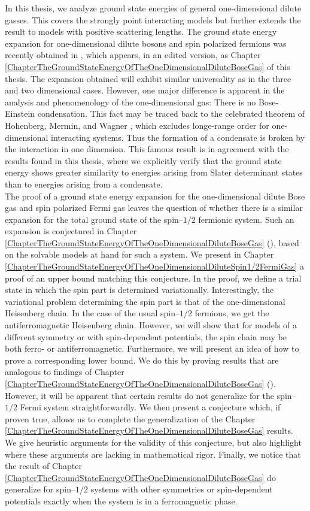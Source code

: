 In this thesis, we analyze ground state energies of general one-dimensional dilute gasses. This covers the strongly point interacting models but further extends the result to models with positive scattering lengths. The ground state energy expansion for one-dimensional dilute bosons and spin polarized fermions was recently obtained in \cite{agerskov2022ground}, which appears, in an edited version, as Chapter \ref{ChapterTheGroundStateEnergyOfTheOneDimensionalDiluteBoseGas} of this thesis. The expansion obtained will exhibit similar universality as in the three and two dimensional cases. However, one major difference is apparent in the analysis and phenomenology of the one-dimensional gas: There is no Bose-Einstein condensation. This fact may be traced back to the celebrated theorem of Hohenberg, Mermin, and Wagner \cite{hohenberg1967existence,mermin1966absence}, which excludes longe-range order for one-dimensional interacting systems. Thus the formation of a condensate is broken by the interaction in one dimension. This famous result is in agreement with the results found in this thesis, where we explicitly verify that the ground state energy shows greater similarity to energies arising from Slater determinant states than to energies arising from a condensate.\\
The proof of a ground state energy expansion for the one-dimensional dilute Bose gas and spin polarized Fermi gas leaves the question of whether there is a similar expansion for the total ground state of the spin--$ 1/2 $ fermionic system. Such an expansion is conjectured in Chapter \ref{ChapterTheGroundStateEnergyOfTheOneDimensionalDiluteBoseGas} (\cite{agerskov2022ground}), based on the solvable models at hand for such a system. We present in Chapter \ref{ChapterTheGroundStateEnergyOfTheOneDimensionalDiluteSpin1/2FermiGas} a proof of an upper bound matching this conjecture. In the proof, we define a trial state in which the spin part is determined variationally. Interestingly, the variational problem determining the spin part is that of the one-dimensional Heisenberg chain. In the case of the usual spin--$ 1/2 $ fermions, we get the antiferromagnetic Heisenberg chain. However, we will show that for models of a different symmetry or with spin-dependent potentials, the spin chain may be both ferro- or antiferromagnetic. Furthermore, we will present an idea of how to prove a corresponding lower bound. We do this by proving results that are analogous to findings of Chapter \ref{ChapterTheGroundStateEnergyOfTheOneDimensionalDiluteBoseGas} (\cite{agerskov2022ground}). However, it will be apparent that certain results do not generalize for the spin--$ 1/2 $ Fermi system straightforwardly. We then present a conjecture which, if proven true, allows us to complete the generalization of the Chapter \ref{ChapterTheGroundStateEnergyOfTheOneDimensionalDiluteBoseGas} results. We give heuristic arguments for the validity of this conjecture, but also highlight where these arguments are lacking in mathematical rigor. Finally, we notice that the result of Chapter \ref{ChapterTheGroundStateEnergyOfTheOneDimensionalDiluteBoseGas} do generalize for spin--$ 1/2 $ systems with other symmetries or spin-dependent potentials exactly when the system is in a ferromagnetic phase.\\


